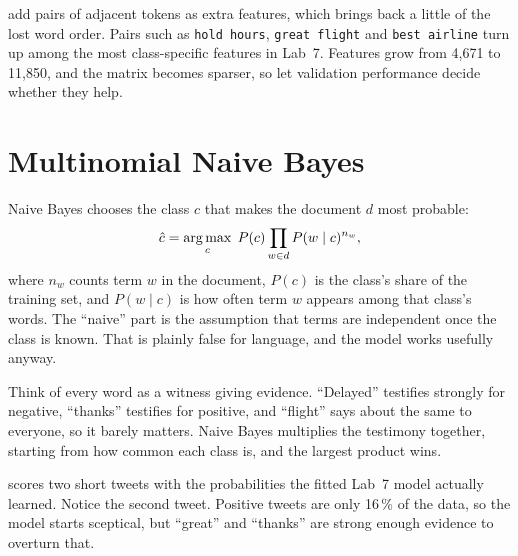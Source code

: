  add pairs of adjacent tokens as extra features, which brings back a little of the lost word order. Pairs such as \texttt{hold hours}, \texttt{great flight} and \texttt{best airline} turn up among the most class-specific features in Lab~7. Features grow from 4,671 to 11,850, and the matrix becomes sparser, so let validation performance decide whether they help.

\section{Multinomial Naive Bayes}

Naive Bayes chooses the class $c$ that makes the document $d$ most probable:
\[
\hat c=\operatorname*{arg\,max}_c\; P(c)\prod_{w\in d}P(w\mid c)^{n_w},
\]
where $n_w$ counts term $w$ in the document, $P(c)$ is the class's share of the training set, and $P(w\mid c)$ is how often term $w$ appears among that class's words. The ``naive'' part is the assumption that terms are independent once the class is known. That is plainly false for language, and the model works usefully anyway.

\begin{intuition}
Think of every word as a witness giving evidence. ``Delayed'' testifies strongly for negative, ``thanks'' testifies for positive, and ``flight'' says about the same to everyone, so it barely matters. Naive Bayes multiplies the testimony together, starting from how common each class is, and the largest product wins.
\end{intuition}

 scores two short tweets with the probabilities the fitted Lab~7 model actually learned. Notice the second tweet. Positive tweets are only 16\,\% of the data, so the model starts sceptical, but ``great'' and ``thanks'' are strong enough evidence to overturn that.

